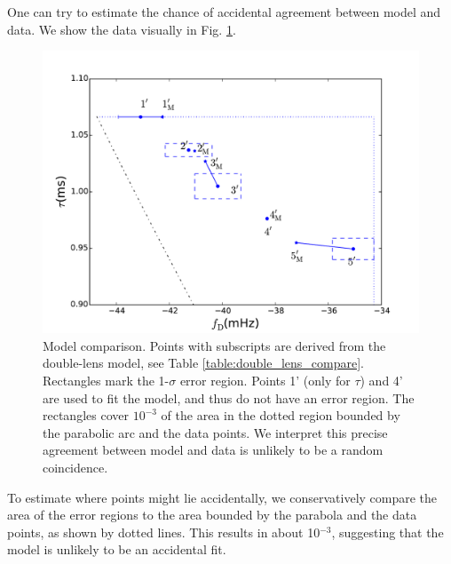 \documentclass[useAMS,usenatbib]{mn2e}
\begin{document}
One can try to estimate the chance of accidental agreement between
model and data.
We show the data visually in Fig. \ref{fig:tau-fD}.  
\begin{figure}
\centering
\includegraphics[width=1.0\linewidth, angle=0]{tau-fD_Nov25.pdf}
\caption{Model comparison.
Points with subscripts are derived from the double-lens model, see
Table \ref{table:double_lens_compare}.  
Rectangles mark the 1-$\sigma$ error region.
Points 1' (only for $\tau$) and 4' are used to fit the model, and
thus do not have an error region.  The rectangles cover $10^{-3}$ of
the area in the dotted region bounded by the parabolic arc and the
data points.  We interpret this precise agreement
between model and data 
is unlikely to be a random coincidence.
}
\label{fig:tau-fD}
\end{figure}

To estimate where points might lie accidentally, we conservatively
compare the area of the error regions to the area bounded by the
parabola and the data points, as shown by dotted lines.  This results
in about 10$^{-3}$, suggesting that the model is unlikely to be an
accidental fit.
\end{document}
